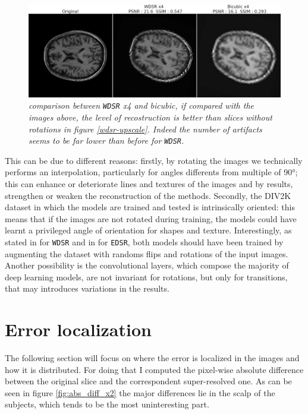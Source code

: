 \documentclass[12pt,a4paper]{report}
\begin{document}
\begin{figure}[H]
 \centering
 \includegraphics[scale=0.3]{./images/wdsr_angle_18.png}
 \caption{\it comparison between {\tt WDSR} x4 and bicubic, if compared with the images above, the level of recostruction is better than slices without rotations in figure \ref{wdsr-upscale}. Indeed the number of artifacts seems to be far lower than before for {\tt WDSR}.}
 \label{fig:wdsr-angle-18}
\end{figure}

This can be due to different reasons: firstly, by rotating the images we technically performs an interpolation, particularly for angles differents from multiple of 90°; this can enhance or deteriorate lines and textures of the images and by results, strengthen or weaken the reconstruction of the methods. 
Secondly, the DIV2K dataset in which the models are trained and tested is intrinsically oriented: this means that if the images are not rotated during training, the models could have learnt a privileged angle of orientation for shapes and texture.
Interestingly, as stated in \cite{wdsr} for {\tt WDSR} and in \cite{edsr} for {\tt EDSR}, both models should have been trained by augmenting the dataset with randoms flips and rotations of the input images. 
Another possibility is the convolutional layers, which compose the majority of deep learning models, are not invariant for rotations, but only for transitions, that may introduces variations in the results.

\newpage

\section{Error localization}

The following section will focus on where the error is localized in the images and how it is distributed. 
For doing that I computed the pixel-wise absolute difference between the original slice and the correspondent super-resolved one. As can be seen in figure \ref{fig:abs_diff_x2} the major differences lie in the scalp of the subjects, which tends to be the most uninteresting part.
\end{document}
